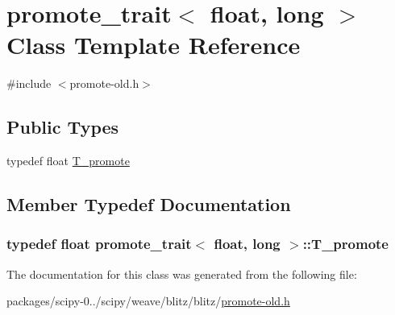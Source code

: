 \hypertarget{classpromote__trait_3_01float_00_01long_01_4}{}\section{promote\+\_\+trait$<$ float, long $>$ Class Template Reference}
\label{classpromote__trait_3_01float_00_01long_01_4}


{\ttfamily \#include $<$promote-\/old.\+h$>$}

\subsection*{Public Types}
\begin{DoxyCompactItemize}
\item 
typedef float \hyperlink{classpromote__trait_3_01float_00_01long_01_4_a228d8607719a5003286e8e7b5151ec76}{T\+\_\+promote}
\end{DoxyCompactItemize}


\subsection{Member Typedef Documentation}
\hypertarget{classpromote__trait_3_01float_00_01long_01_4_a228d8607719a5003286e8e7b5151ec76}{}
\subsubsection[{T\+\_\+promote}]{\setlength{\rightskip}{0pt plus 5cm}typedef float {\bf promote\+\_\+trait}$<$ float, long $>$\+::{\bf T\+\_\+promote}}\label{classpromote__trait_3_01float_00_01long_01_4_a228d8607719a5003286e8e7b5151ec76}


The documentation for this class was generated from the following file\+:\begin{DoxyCompactItemize}
\item 
packages/scipy-\/0../scipy/weave/blitz/blitz/\hyperlink{promote-old_8h}{promote-\/old.\+h}\end{DoxyCompactItemize}
